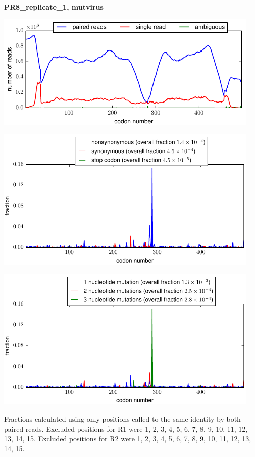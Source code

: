 \documentclass[10pt,letterpaper]{article}
\begin{document}
\centerline{\Large \bf PR8\_replicate\_1, mutvirus}
\vspace{0.1in}

\centerline{\includegraphics[width=5in]{PR8_replicate_1_mutvirus_codondepth.pdf}}
\vspace{0.1in}

\centerline{\includegraphics[width=5in]{PR8_replicate_1_mutvirus_syn-ns-dist.pdf}}
\vspace{0.1in}

\centerline{\includegraphics[width=5in]{PR8_replicate_1_mutvirus_nmutspercodon-dist.pdf}}
\vspace{0.1in}

Fractions calculated using only positions called to the same identity by both paired reads.  Excluded positions for R1 were 1, 2, 3, 4, 5, 6, 7, 8, 9, 10, 11, 12, 13, 14, 15. 
 Excluded positions for R2 were 1, 2, 3, 4, 5, 6, 7, 8, 9, 10, 11, 12, 13, 14, 15. 
\end{document}
